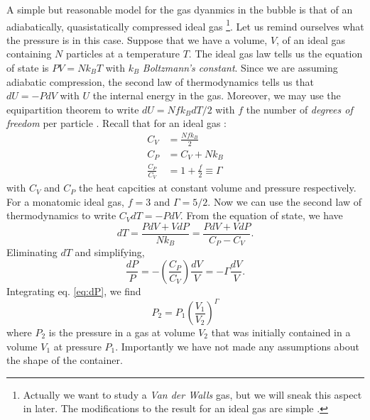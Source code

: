 \documentclass[rmp,aps,nofootinbib,superscriptaddress,floatfix]{revtex4-2}
\begin{document}
A simple but reasonable model for the gas dyanmics in the bubble is that of an adiabatically, quasistatically compressed ideal gas \cite{brenner2002single} \footnote{Actually we want to study a \emph{Van der Walls} gas, but we will sneak this aspect in later. The modifications to the result for an ideal gas are simple \cite{sivasubramanian2002temperature}.}. Let us remind ourselves what the pressure is in this case. Suppose that we have a volume, $V$, of an ideal gas containing $N$ particles at a temperature $T$. The ideal gas law tells us the equation of state is $PV=Nk_BT$ with $k_B$ \emph{Boltzmann's constant}. Since we are assuming adiabatic compression, the second law of thermodynamics tells us that $dU=-PdV$ with $U$ the internal energy in the gas. Moreover, we may use the equipartition theorem to write $dU=N f k_B dT/2$ with $f$ the number of \emph{degrees of freedom} per particle \cite{}. Recall that for an ideal gas \cite{}:
\begin{equation}
\begin{split}
    C_V &= \frac{N f k_B}{2} \\
    C_P &= C_V+N k_B \\
    \frac{C_P}{C_V} &= 1+\frac{f}{2} \equiv \Gamma 
\end{split}
\end{equation}
with $C_V$ and $C_P$ the heat capcities at constant volume and pressure respectively. For a monatomic ideal gas, $f=3$ and $\Gamma=5/2$. Now we can use the second law of thermodynamics to write $C_V dT = -P dV$. From the equation of state, we have
\begin{equation}
    dT = \frac{PdV+VdP}{Nk_B}=\frac{PdV+VdP}{C_P-C_V}.
\end{equation}
Eliminating $dT$ and simplifying, 
\begin{equation}
    \frac{dP}{P}=-\left(\frac{C_P}{C_V}\right) \frac{dV}{V} = -\Gamma \frac{dV}{V}.
    \label{eq:dP}
\end{equation}
Integrating eq. \ref{eq:dP}, we find 
\begin{equation}
    P_2 = P_1 \left(\frac{V_1}{V_2}\right)^\Gamma
\label{eq:P}
\end{equation}
where $P_2$ is the pressure in a gas at volume $V_2$ that was initially contained in a volume $V_1$ at pressure $P_1$. Importantly we have not made any assumptions about the shape of the container. 
\end{document}
